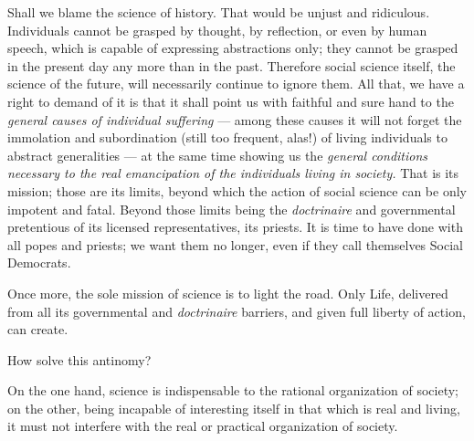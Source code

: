 \documentclass[12pt]{report}
\begin{document}
Shall we blame the science of history. That would be unjust and ridiculous. Individuals cannot be grasped by thought, by reflection, or even by human speech, which is capable of expressing abstractions only; they cannot be grasped in the present day any more than in the past. Therefore social science itself, the science of the future, will necessarily continue to ignore them. All that, we have a right to demand of it is that it shall point us with faithful and sure hand to the \emph{general causes of individual suffering} — among these causes it will not forget the immolation and subordination (still too frequent, alas!) of living individuals to abstract generalities — at the same time showing us the \emph{general conditions necessary to the real emancipation of the individuals living in society.} That is its mission; those are its limits, beyond which the action of social science can be only impotent and fatal. Beyond those limits being the \emph{doctrinaire} and governmental pretentious of its licensed representatives, its priests. It is time to have done with all popes and priests; we want them no longer, even if they call themselves Social Democrats.


Once more, the sole mission of science is to light the road. Only Life, delivered from all its governmental and \emph{doctrinaire} barriers, and given full liberty of action, can create.


How solve this antinomy?


On the one hand, science is indispensable to the rational organization of society; on the other, being incapable of interesting itself in that which is real and living, it must not interfere with the real or practical organization of society.
\end{document}
